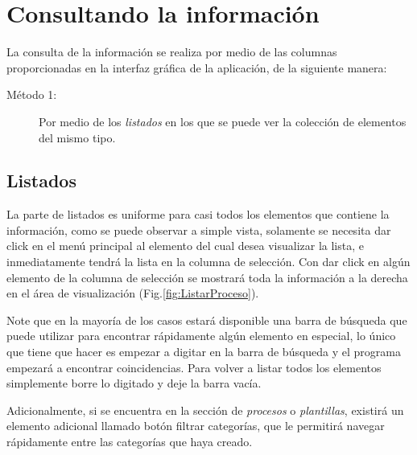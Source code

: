 \chapter{Consultando la informaci\'on}
\label{sec:consultandoLaInformacion}
La consulta de la informaci\'on se realiza por medio de las columnas proporcionadas en la interfaz gr\'afica de la aplicaci\'on, de la siguiente manera:

\begin{description}
  \item[M\'etodo 1:]Por medio de los \emph{listados} en los que se puede ver la
  colecci\'on de elementos del mismo tipo.
  
\end{description}

\section{Listados}
La parte de listados es uniforme para casi todos los elementos que contiene la informaci\'on, como se puede observar a simple vista, solamente se necesita dar click en el men\'u principal al elemento del cual desea visualizar la lista, e inmediatamente tendr\'a la lista en la columna de selecci\'on. Con dar click en alg\'un elemento de la columna de selecci\'on se mostrar\'a toda la informaci\'on a la derecha en el \'area de visualizaci\'on (Fig.\ref{fig:ListarProceso}). 


Note que en la mayor\'ia de los casos estar\'a disponible una barra de b\'usqueda que puede utilizar para encontrar r\'apidamente alg\'un elemento en especial, lo \'unico que tiene que hacer es empezar a digitar en la barra de b\'usqueda y el programa empezar\'a a encontrar coincidencias. Para volver a listar todos los elementos simplemente borre lo digitado y deje la barra vac\'ia.


Adicionalmente, si se encuentra en la secci\'on de \emph{procesos} o \emph{plantillas}, existir\'a un elemento adicional llamado bot\'on filtrar categor\'ias, que le permitir\'a navegar r\'apidamente entre las categor\'ias que haya creado.




